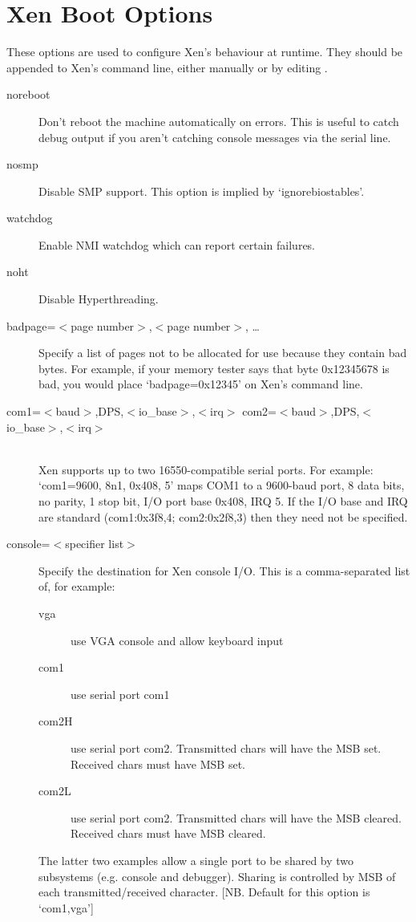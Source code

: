 \documentclass[11pt,twoside,final,openright]{report}
\begin{document}
{\section{Xen Boot Options}
\label{s:xboot}

These options are used to configure Xen's behaviour at runtime.  They
should be appended to Xen's command line, either manually or by
editing .

\begin{description}
\item [noreboot ] 
 Don't reboot the machine automatically on errors.  This is
 useful to catch debug output if you aren't catching console messages
 via the serial line. 

\item [nosmp ] 
 Disable SMP support.
 This option is implied by `ignorebiostables'. 

\item [watchdog ] 
 Enable NMI watchdog which can report certain failures. 

\item [noht ] 
 Disable Hyperthreading. 

\item [badpage=$<$page number$>$,$<$page number$>$, \ldots ] 
 Specify a list of pages not to be allocated for use 
 because they contain bad bytes. For example, if your
 memory tester says that byte 0x12345678 is bad, you would
 place `badpage=0x12345' on Xen's command line. 

\item [com1=$<$baud$>$,DPS,$<$io\_base$>$,$<$irq$>$
 com2=$<$baud$>$,DPS,$<$io\_base$>$,$<$irq$>$ ] \mbox{}\\ 
 Xen supports up to two 16550-compatible serial ports.
 For example: `com1=9600, 8n1, 0x408, 5' maps COM1 to a
 9600-baud port, 8 data bits, no parity, 1 stop bit,
 I/O port base 0x408, IRQ 5.
 If the I/O base and IRQ are standard (com1:0x3f8,4;
 com2:0x2f8,3) then they need not be specified. 

\item [console=$<$specifier list$>$ ] 
 Specify the destination for Xen console I/O.
 This is a comma-separated list of, for example:
\begin{description}
 \item[vga]  use VGA console and allow keyboard input
 \item[com1] use serial port com1
 \item[com2H] use serial port com2. Transmitted chars will
   have the MSB set. Received chars must have
   MSB set.
 \item[com2L] use serial port com2. Transmitted chars will
   have the MSB cleared. Received chars must
   have MSB cleared.
\end{description}
 The latter two examples allow a single port to be
 shared by two subsystems (e.g. console and
 debugger). Sharing is controlled by MSB of each
 transmitted/received character.
 [NB. Default for this option is `com1,vga'] 


\end{description}}
\end{document}
